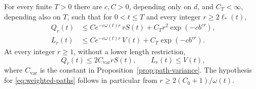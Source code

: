 \begin{proposition}
\label{prop:weighted-paths}
For every finite $T>0$ there are $c,C>0$, depending only on $d$, and
$C_T<\infty$, depending also on $T$, such that for $0<t\le T$ and
every integer $r\ge2\ell_*(t)$,
\begin{equation}
 \begin{aligned}
 Q_r(t)&\le C e^{-c\omega(t)r}\,rS(t)
       +C_T r^2\exp(-c b^{cr}),\\
 L_r(t)&\le C e^{-c\omega(t)r}\,V(t)
       +C_T\exp(-c b^{cr}).
 \end{aligned}
 \label{eq:weighted-paths}
\end{equation}
At every integer $r\ge1$, without a lower length restriction,
\begin{equation}
 Q_r(t)\le2C_{\mathrm{var}}rS(t),\qquad L_r(t)\le V(t),
 \label{eq:unweighted-bounds}
\end{equation}
where $C_{\mathrm{var}}$ is the constant in
Proposition~\ref{prop:path-variance}.  The hypothesis for
\eqref{eq:weighted-paths} follows in particular from
$r\ge2(C_0+1)/\omega(t)$.
\end{proposition}


